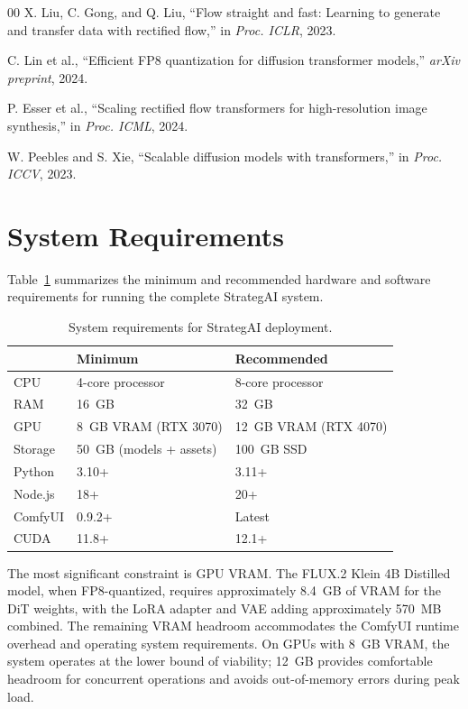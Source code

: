 \documentclass[conference]{IEEEtran}
\begin{document}
\begin{thebibliography}{00}
 X. Liu, C. Gong, and Q. Liu, ``Flow straight and fast: Learning to generate and transfer data with rectified flow,'' in \emph{Proc. ICLR}, 2023.

 C. Lin et al., ``Efficient FP8 quantization for diffusion transformer models,'' \emph{arXiv preprint}, 2024.

 P. Esser et al., ``Scaling rectified flow transformers for high-resolution image synthesis,'' in \emph{Proc. ICML}, 2024.

 W. Peebles and S. Xie, ``Scalable diffusion models with transformers,'' in \emph{Proc. ICCV}, 2023.

\end{thebibliography}

\appendix

\section{System Requirements}
\label{app:requirements}

Table~\ref{tab:requirements} summarizes the minimum and recommended hardware and software requirements for running the complete StrategAI system.

\begin{table}[h]
\centering
\caption{System requirements for StrategAI deployment.}
\label{tab:requirements}
\begin{tabular}{@{}p{2.2cm}p{3.5cm}p{3.5cm}@{}}
\toprule
& \textbf{Minimum} & \textbf{Recommended} \\
\midrule
CPU & 4-core processor & 8-core processor \\
RAM & 16~GB & 32~GB \\
GPU & 8~GB VRAM (RTX 3070) & 12~GB VRAM (RTX 4070) \\
Storage & 50~GB (models + assets) & 100~GB SSD \\
\midrule
Python & 3.10+ & 3.11+ \\
Node.js & 18+ & 20+ \\
ComfyUI & 0.9.2+ & Latest \\
CUDA & 11.8+ & 12.1+ \\
\bottomrule
\end{tabular}
\end{table}

The most significant constraint is GPU VRAM. The FLUX.2 Klein 4B Distilled model, when FP8-quantized, requires approximately 8.4~GB of VRAM for the DiT weights, with the LoRA adapter and VAE adding approximately 570~MB combined. The remaining VRAM headroom accommodates the ComfyUI runtime overhead and operating system requirements. On GPUs with 8~GB VRAM, the system operates at the lower bound of viability; 12~GB provides comfortable headroom for concurrent operations and avoids out-of-memory errors during peak load.
\end{document}
